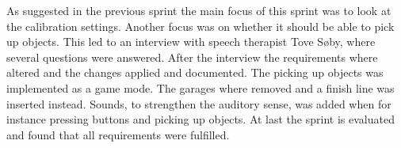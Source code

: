 As suggested in the previous sprint the main focus of this sprint was to look at the calibration settings.
Another focus was on whether it should be able to pick up objects.
This led to an interview with speech therapist Tove Søby, where several questions were answered.
After the interview the requirements where altered and the changes applied and documented.
The picking up objects was implemented as a game mode.
The garages where removed and a finish line was inserted instead.
Sounds, to strengthen the auditory sense, was added when for instance pressing buttons and picking up objects.
At last the sprint is evaluated and found that all requirements were fulfilled.